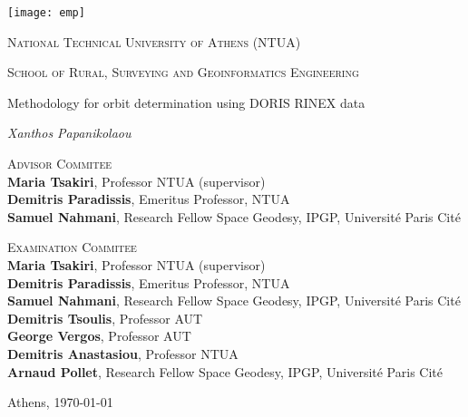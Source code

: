 \begin{center}
  \texttt{[image: emp]}\par\vspace{.8cm}
  {\Large \textsc{National Technical University of Athens (NTUA)} \par}
  {\Large \textsc{School of Rural, Surveying and Geoinformatics Engineering} \par}
  \vspace{.5cm}
  {\huge Methodology for orbit determination using DORIS RINEX data \par}
  \vspace{1cm}
  {\Large\itshape Xanthos Papanikolaou\par}
  \vfill

  \textsc{Advisor Commitee}\\
  \textbf{Maria Tsakiri}, Professor NTUA (supervisor)\\
  \textbf{Demitris Paradissis}, Emeritus Professor, NTUA \\
  \textbf{Samuel Nahmani}, Research Fellow Space Geodesy, IPGP, Université Paris Cité \par

  \textsc{Examination Commitee}\\
  \textbf{Maria Tsakiri}, Professor NTUA (supervisor)\\
  \textbf{Demitris Paradissis}, Emeritus Professor, NTUA \\
  \textbf{Samuel Nahmani}, Research Fellow Space Geodesy, IPGP, Université Paris Cité \\
  \textbf{Demitris Tsoulis}, Professor AUT \\
  \textbf{George Vergos}, Professor AUT \\
  \textbf{Demitris Anastasiou}, Professor NTUA \\
  \textbf{Arnaud Pollet}, Research Fellow Space Geodesy, IPGP, Université Paris Cité \par

  \vfill
  {\large Athens, \today\par}
\end{center}
\clearpage

